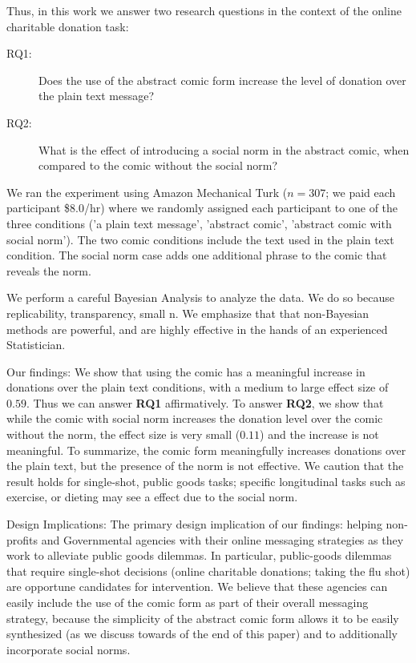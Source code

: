Thus, in this work we answer two research questions in the context of the online charitable donation task:
\begin{description}
    \item[RQ1:] Does the use of the abstract comic form increase the level of donation over the plain text message?
    \item[RQ2:] What is the effect of introducing a social norm in the abstract comic, when compared to the comic without the social norm?
\end{description}

We ran the experiment using Amazon Mechanical Turk ($n=307$; we paid each participant \$8.0/hr) where we randomly assigned each participant to one of the three conditions ('a plain text message', 'abstract comic', 'abstract comic with social norm'). The two comic conditions include the text used in the plain text condition. The social norm case adds one additional phrase to the comic that reveals the norm.

We perform a careful Bayesian Analysis to analyze the data. We do so because replicability, transparency, small n. We emphasize that that non-Bayesian methods are powerful, and are highly effective in the hands of an experienced Statistician. 

Our findings: We show that using the comic has a meaningful increase in donations over the plain text conditions, with a medium to large effect size of $0.59$. Thus we can answer \textbf{RQ1} affirmatively. To answer \textbf{RQ2}, we show that while the comic with social norm increases the donation level over the comic without the norm, the effect size is very small ($0.11$) and the increase is not meaningful. To summarize, the comic form meaningfully increases donations over the plain text, but the presence of the norm is not effective. We caution that the result holds for single-shot, public goods tasks; specific longitudinal tasks such as exercise, or dieting may see a effect due to the social norm.  

Design Implications: The primary design implication of our findings: helping non-profits and Governmental agencies with their online messaging strategies as they work to alleviate public goods dilemmas. In particular, public-goods dilemmas that require single-shot decisions (online charitable donations; taking the flu shot) are opportune candidates for intervention. We believe that these agencies can easily include the use of the comic form as part of their overall messaging strategy, because the simplicity of the abstract comic form allows it to be easily synthesized (as we discuss towards of the end of this paper) and to additionally incorporate social norms. 








